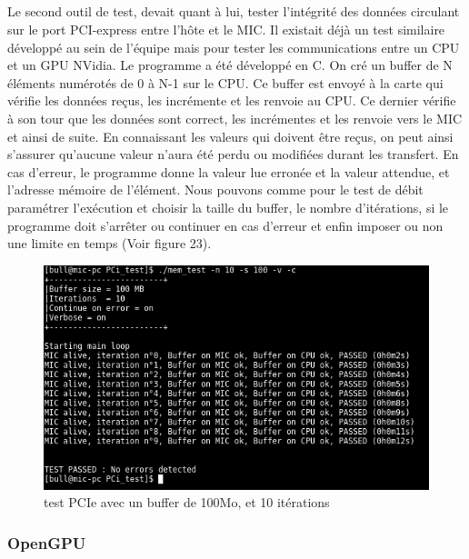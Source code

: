 \documentclass{article}
\begin{document}
					\subparagraph{}
					Le second outil de test, devait quant à lui, tester l'intégrité des données circulant sur le port PCI-express 
					entre l'hôte et le MIC. Il existait déjà un test similaire développé au sein de l'équipe mais pour tester 
					les communications entre un CPU et un GPU NVidia. \newline
					Le programme a été développé en C. On cré un buffer de N éléments numérotés de 0 à N-1 sur le CPU. Ce buffer 
					est envoyé à la carte qui vérifie les données reçus, les incrémente et les renvoie au CPU. Ce dernier vérifie 
					à son tour que les données sont correct, les incrémentes et les renvoie vers le MIC et ainsi de suite. En 
					connaissant les valeurs qui doivent être reçus, on peut ainsi s'assurer qu'aucune valeur n'aura été perdu ou 
					modifiées durant les transfert. En cas d'erreur, le programme donne la valeur lue erronée et la valeur attendue,
					et l'adresse mémoire de l'élément. Nous pouvons comme pour le test de débit paramétrer l'exécution et choisir 
					la taille du buffer, le nombre d'itérations, si le programme doit s'arrêter ou continuer en cas d'erreur et 
					enfin imposer ou non une limite en temps (Voir figure 23).
					\begin{figure}
					\begin{center}
					\includegraphics[scale=0.4]{memtest.png}
					\caption{test PCIe avec un buffer de 100Mo, et 10 itérations}
					\end{center}
					\end{figure}
			\subsubsection{OpenGPU}
\end{document}
